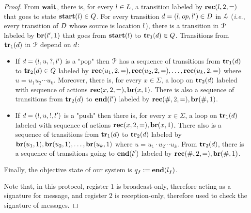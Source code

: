 \begin{proof}
	From $\mathbf{wait}$, there is, for every $l \in L$, a transition labeled by $\rec{\mathsf{\lstate}}{2}{\eqtestact}$ that goes to state $\mathbf{start}(l) \in Q$. 
	For every transition $\ltrans = (\lstate, \op, \lstate') \in \ltransitions$ in $\mathcal{L}$ (\emph{i.e.}, every transition of $D$ whose source is location $l$), there is a transition in $\mathcal{P}$ labeled by $\br{\mathsf{\lstate'}}{1}$ that goes from $\mathbf{start}(l)$ to $\mathbf{tr}_1(d) \in Q$. 
	Transitions from $\mathbf{tr}_1(d)$ in $\mathcal{P}$ depend on $d$:
	\begin{itemize}
		\item If $d=(l, u,?, l')$ is a "pop" then $\mathcal{P}$ has a sequence of transitions from $\mathbf{tr}_1(d)$ to $\mathbf{tr}_2(d) \in Q$ labeled by $\rec{\mathsf{u_1}}{2}{\eqtestact}, \rec{\mathsf{u_2}}{2}{\eqtestact}, \dots, \rec{\mathsf{u_k}}{2}{\eqtestact}$ where $u = u_1 u_2 \cdots u_k$. Moreover, there is, for every $x \in \Sigma$, a loop on $\mathbf{tr}_2(d)$ labeled with sequence of actions $\rec{\mathsf{x}}{2}{\eqtestact}, \br{\mathsf{x}}{1}$. There is also a sequence of  transitions from $\mathbf{tr}_2(d)$ to $\mathbf{end}(l')$ labeled by $\rec{\mathsf{\#}}{2}{\eqtestact}, \br{\mathsf{\#}}{1}$.
		\item If $d= (l, u,!, l')$ is a "push" then there is, for every $x \in \Sigma$, a loop on $\mathbf{tr}_1(d)$ labeled with sequence of actions $\rec{\mathsf{x}}{2}{\eqtestact}, \br{\mathsf{x}}{1}$. There also is a sequence of transitions from $\mathbf{tr}_1(d)$ to $\mathbf{tr}_2(d)$ labeled by $\br{\mathsf{u_1}}{1}, \br{\mathsf{u_2}}{1}, \dots, \br{\mathsf{u_k}}{1}$ where $u = u_1 \cdot u_2 \cdots u_k$. From $\mathbf{tr}_2(d)$, there is  a sequence of transitions going to $\mathbf{end}(l')$ labeled by $\rec{\mathsf{\#}}{2}{\eqtestact}, \br{\mathsf{\#}}{1}$.
	\end{itemize}
	Finally, the objective state of our system is $q_f := \mathbf{end}(l_f)$.
	
	Note that, in this protocol, register $1$ is broadcast-only, therefore acting as a signature for message, and register $2$ is reception-only, therefore used to check the signature of messages.
	

\end{proof}
